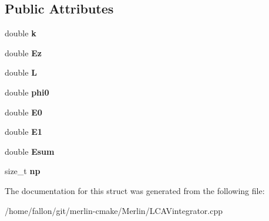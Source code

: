 \subsection*{Public Attributes}
\begin{DoxyCompactItemize}
\item 
\mbox{\label{structParticleTracking_1_1LCAVMap_a66d158feeee8abc3e726a9eec6d0d0a0}} 
double {\bfseries k}
\item 
\mbox{\label{structParticleTracking_1_1LCAVMap_af8f697e9dc1071f8349defb1e76055b2}} 
double {\bfseries Ez}
\item 
\mbox{\label{structParticleTracking_1_1LCAVMap_a11466df4eb8378aabc1d4d5288392997}} 
double {\bfseries L}
\item 
\mbox{\label{structParticleTracking_1_1LCAVMap_ae4cd215967becd24bef9bea9cfa9895b}} 
double {\bfseries phi0}
\item 
\mbox{\label{structParticleTracking_1_1LCAVMap_acbe32520f83bf7dbca2bb426409d4887}} 
double {\bfseries E0}
\item 
\mbox{\label{structParticleTracking_1_1LCAVMap_aae986c2cc3fe9adb4cb99fe46e2b3bd3}} 
double {\bfseries E1}
\item 
\mbox{\label{structParticleTracking_1_1LCAVMap_af772db9fb1de30281919e2eef8c583db}} 
double {\bfseries Esum}
\item 
\mbox{\label{structParticleTracking_1_1LCAVMap_a7ebbd05524b4917790910bacd42b2668}} 
size\+\_\+t {\bfseries np}
\end{DoxyCompactItemize}


The documentation for this struct was generated from the following file\+:\begin{DoxyCompactItemize}
\item 
/home/fallon/git/merlin-\/cmake/\+Merlin/L\+C\+A\+Vintegrator.\+cpp\end{DoxyCompactItemize}

